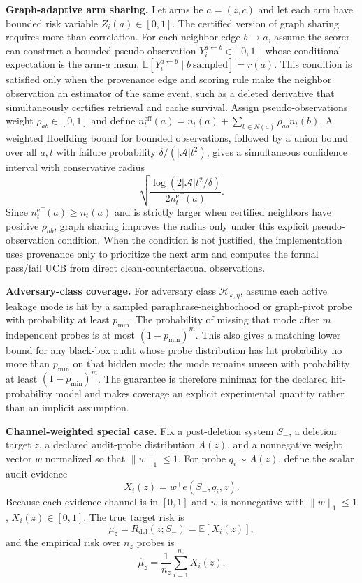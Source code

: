 \textbf{Graph-adaptive arm sharing.}
Let arms be $a=(z,c)$ and let each arm have bounded risk variable $Z_i(a)\in[0,1]$. The certified version of graph sharing requires more than correlation. For each neighbor edge $b\to a$, assume the scorer can construct a bounded pseudo-observation $Y_i^{a\leftarrow b}\in[0,1]$ whose conditional expectation is the arm-$a$ mean, $\mathbb{E}[Y_i^{a\leftarrow b}\mid b\ \mathrm{sampled}]=r(a)$. This condition is satisfied only when the provenance edge and scoring rule make the neighbor observation an estimator of the same event, such as a deleted derivative that simultaneously certifies retrieval and cache survival. Assign pseudo-observations weight $\rho_{ab}\in[0,1]$ and define $n_t^{\mathrm{eff}}(a)=n_t(a)+\sum_{b\in N(a)}\rho_{ab}n_t(b)$. A weighted Hoeffding bound for bounded observations, followed by a union bound over all $a,t$ with failure probability $\delta/(|\mathcal{A}|t^2)$, gives a simultaneous confidence interval with conservative radius
\[
\sqrt{\frac{\log(2|\mathcal{A}|t^2/\delta)}{2n_t^{\mathrm{eff}}(a)}}.
\]
Since $n_t^{\mathrm{eff}}(a)\geq n_t(a)$ and is strictly larger when certified neighbors have positive $\rho_{ab}$, graph sharing improves the radius only under this explicit pseudo-observation condition. When the condition is not justified, the implementation uses provenance only to prioritize the next arm and computes the formal pass/fail UCB from direct clean-counterfactual observations.

\textbf{Adversary-class coverage.}
For adversary class $\mathcal{H}_{k,\eta}$, assume each active leakage mode is hit by a sampled paraphrase-neighborhood or graph-pivot probe with probability at least $p_{\min}$. The probability of missing that mode after $m$ independent probes is at most $(1-p_{\min})^m$. This also gives a matching lower bound for any black-box audit whose probe distribution has hit probability no more than $p_{\min}$ on that hidden mode: the mode remains unseen with probability at least $(1-p_{\min})^m$. The guarantee is therefore minimax for the declared hit-probability model and makes coverage an explicit experimental quantity rather than an implicit assumption.

\textbf{Channel-weighted special case.}
Fix a post-deletion system $S_-$, a deletion target $z$, a declared audit-probe distribution $A(z)$, and a nonnegative weight vector $w$ normalized so that $\|w\|_1\leq 1$. For probe $q_i\sim A(z)$, define the scalar audit evidence
\[
X_i(z)=w^\top e(S_-,q_i,z).
\]
Because each evidence channel is in $[0,1]$ and $w$ is nonnegative with $\|w\|_1\leq 1$, $X_i(z)\in[0,1]$. The true target risk is
\[
\mu_z=R_{\mathrm{del}}(z;S_-)=\mathbb{E}[X_i(z)],
\]
and the empirical risk over $n_z$ probes is
\[
\hat\mu_z=\frac{1}{n_z}\sum_{i=1}^{n_z} X_i(z).
\]

